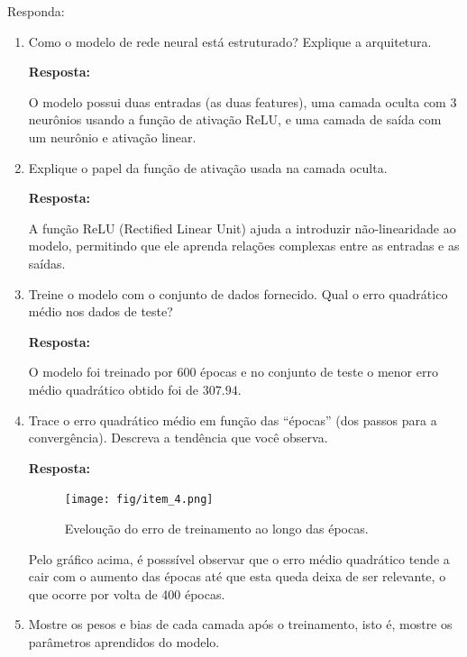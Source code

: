 \documentclass[12 pt]{article}
\begin{document}
Responda:

\begin{enumerate}
    \item Como o modelo de rede neural está estruturado? Explique a arquitetura.
    
    \textbf{Resposta:} \par

    O modelo possui duas entradas (as duas features), uma camada oculta com 3 neurônios usando a função de ativação ReLU, e uma camada de saída com um neurônio e ativação linear.

    \item Explique o papel da função de ativação usada na camada oculta.
   
    \textbf{Resposta:} \par

    A função ReLU (Rectified Linear Unit) ajuda a introduzir não-linearidade ao modelo, permitindo que ele aprenda relações complexas entre as entradas e as saídas.

    \item Treine o modelo com o conjunto de dados fornecido. Qual o erro quadrático médio nos dados de teste?
       
    \textbf{Resposta:} \par

    O modelo foi treinado por 600 épocas e no conjunto de teste o menor erro médio quadrático obtido foi de \textbf{$307.94$}.

    \item Trace o erro quadrático médio em função das “épocas” (dos passos para a convergência). Descreva a tendência que você observa.
       
    \textbf{Resposta:} \par

    \begin{figure}[H]
        \caption{Eveloução do erro de treinamento ao longo das épocas.}
           \centering
           \texttt{[image: fig/item\_4.png]}
    \end{figure}

    Pelo gráfico acima, é posssível observar que o erro médio quadrático tende a cair com o aumento das épocas até que esta queda deixa de ser relevante, o que ocorre por volta de 400 épocas.

    \item Mostre os pesos e bias de cada camada após o treinamento, isto é, mostre os parâmetros aprendidos do modelo.
       

\end{enumerate}
\end{document}
